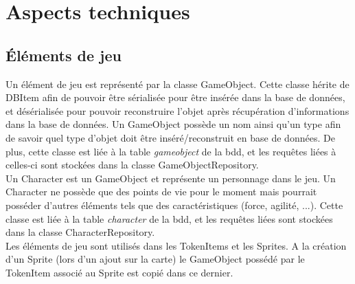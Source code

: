 \section{Aspects techniques}

\subsection{Éléments de jeu}


Un élément de jeu est représenté par la classe GameObject. Cette classe hérite de DBItem afin de pouvoir être sérialisée pour être insérée dans la base de données, et désérialisée pour pouvoir reconstruire l'objet après récupération d'informations dans la base de données. Un GameObject possède un nom ainsi qu'un type afin de savoir quel type d'objet doit être inséré/reconstruit en base de données. De plus, cette classe est liée à la table \emph{gameobject} de la bdd, et les requêtes liées à celles-ci sont stockées dans la classe GameObjectRepository.\\

Un Character est un GameObject et représente un personnage dans le jeu. Un Character ne possède que des points de vie pour le moment mais pourrait posséder d'autres éléments tels que des caractéristiques (force, agilité, ...). Cette classe est liée à la table \emph{character} de la bdd, et les requêtes liées sont stockées dans la classe CharacterRepository.\\

Les éléments de jeu sont utilisés dans les TokenItems et les Sprites. A la création d'un Sprite (lors d'un ajout sur la carte) le GameObject possédé par le TokenItem associé au Sprite est copié dans ce dernier.\\

